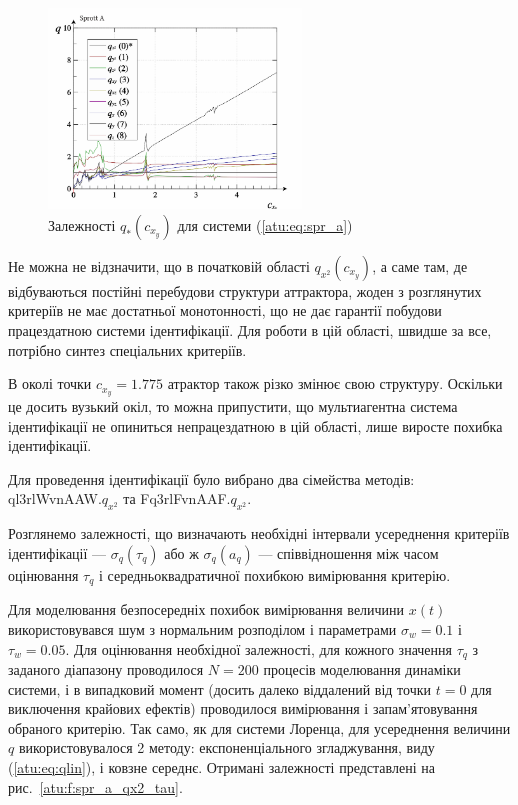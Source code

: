 \begin{figure}[htb!]
\begin{center}
  \includegraphics[width=0.60\textwidth]{p/cha/spr_a/sprott_a_q-p_c_x_y.png}
\end{center}
\caption{Залежності $q_{*} (c_{x_y})$ для системи (\ref{atu:eq:spr_a})}
\label{atu:f:spr_a_q}
\end{figure}

Не можна не відзначити, що в початковій області
$q_{x^2} (c_{x_y})$, а саме там, де відбуваються постійні перебудови
структури аттрактора, жоден з розглянутих критеріїв не
має достатньої монотонності, що не дає гарантії побудови
працездатною системи ідентифікації. Для роботи в цій області,
швидше за все, потрібно синтез спеціальних критеріїв.

В околі точки $c_{x_y} = 1.775$ атрактор також різко змінює свою
структуру. Оскільки це досить вузький окіл, то можна припустити, що
мультиагентна система ідентифікації не опиниться непрацездатною в цій області,
лише виросте похибка ідентифікації.

Для проведення ідентифікації було вибрано два сімейства
методів:
ql3rlWvnAAW.$q_{x^2}$ та
Fq3rlFvnAAF.$q_{x^2}$.

Розглянемо залежності, що визначають необхідні інтервали
усереднення критеріїв ідентифікації
--- $\sigma_q(\tau_q)$
або ж
$\sigma_q (a_q)$ --- співвідношення між часом оцінювання
$\tau_q$ і середньоквадратичної похибкою вимірювання критерію.

Для моделювання безпосередніх похибок вимірювання величини
$x (t)$ використовувався шум з нормальним розподілом і
параметрами
$\sigma_w = 0.1$ і
$\tau_w = 0.05$. Для оцінювання необхідної залежності, для кожного
значення
$\tau_q$ з заданого діапазону проводилося
$N = 200$ процесів моделювання динаміки системи, і в випадковий
момент (досить далеко віддалений від точки
$t = 0$ для виключення крайових ефектів) проводилося вимірювання
і запам'ятовування обраного критерію. Так само, як для системи
Лоренца, для усереднення величини
$q$ використовувалося 2 методу: експоненціального згладжування,
виду (\ref{atu:eq:qlin}), і ковзне середнє. Отримані залежності
представлені на рис.~\ref{atu:f:spr_a_qx2_tau}.


